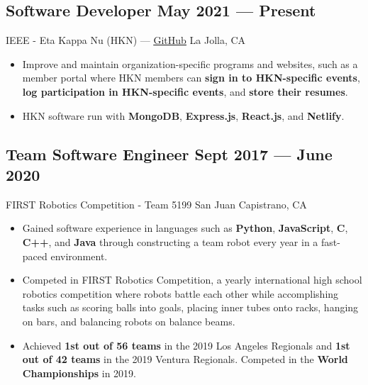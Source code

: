 \documentclass[a4,10pt]{article}
\newcommand{\subtext}[1]{
#1\par\vspace{-0.2cm}}
\newenvironment{zitemize}{
\begin{itemize}\itemsep0pt \parskip0pt \parsep1pt}
{\end{itemize}\vspace{-0.5cm}}
\begin{document}
\subsection*{Software Developer \hfill May 2021 --- Present} 
\subtext{IEEE - Eta Kappa Nu (HKN) —  {\normalsize\normalfont \href{https://github.com/HKN-UCSD/}{{\underline{\textcolor{linkblue}{GitHub}}}}} \hfill La Jolla, CA} 
    \begin{zitemize}
        \item Improve and maintain organization-specific programs and websites, such as a member portal where HKN members can \textbf{sign in to HKN-specific events}, \textbf{log participation in HKN-specific events}, and \textbf{store their resumes}.
        \item HKN software run with \textbf{MongoDB}, \textbf{Express.js}, \textbf{React.js}, and \textbf{Netlify}.
    \end{zitemize}


\subsection*{Team Software Engineer \hfill Sept 2017 --- June 2020} 
\subtext{FIRST Robotics Competition - Team 5199 \hfill San Juan Capistrano, CA} 
    \begin{zitemize}
        \item Gained software experience in languages such as \textbf{Python}, \textbf{JavaScript}, \textbf{C}, \textbf{C++}, and \textbf{Java} through constructing a team robot every year in a fast-paced environment.
        \item Competed in FIRST Robotics Competition, a yearly international high school robotics competition where robots battle each other while accomplishing tasks such as scoring balls into goals, placing inner tubes onto racks, hanging on bars, and balancing robots on balance beams.
        \item Achieved \textbf{1st out of 56 teams} in the 2019 Los Angeles Regionals and \textbf{1st out of 42 teams} in the 2019 Ventura Regionals. Competed in the \textbf{World Championships} in 2019.
    \end{zitemize}

\end{document}
